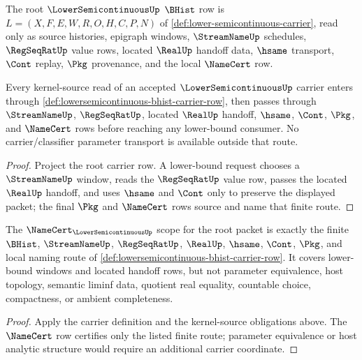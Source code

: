 \begin{definition}
\label{def:lowersemicontinuous-bhist-carrier-row}
The root $\LowerSemicontinuousUp$ $\BHist$ row is
$L=(X,F,E,W,R,O,H,C,P,N)$ of \autoref{def:lower-semicontinuous-carrier},
read only as source histories, epigraph windows, $\StreamNameUp$ schedules,
$\RegSeqRatUp$ value rows, located $\RealUp$ handoff data, $\hsame$ transport,
$\Cont$ replay, $\Pkg$ provenance, and the local $\NameCert$ row.
\end{definition}

\begin{theorem}
\label{thm:lowersemicontinuous-kernel-source-obligations}
Every kernel-source read of an accepted $\LowerSemicontinuousUp$ carrier enters
through \autoref{def:lowersemicontinuous-bhist-carrier-row}, then passes
through $\StreamNameUp$, $\RegSeqRatUp$, located $\RealUp$ handoff, $\hsame$,
$\Cont$, $\Pkg$, and $\NameCert$ rows before reaching any lower-bound consumer.
No carrier/classifier parameter transport is available outside that route.
\end{theorem}
\begin{proof}
Project the root carrier row. A lower-bound request chooses a $\StreamNameUp$
window, reads the $\RegSeqRatUp$ value row, passes the located $\RealUp$
handoff, and uses $\hsame$ and $\Cont$ only to preserve the displayed packet;
the final $\Pkg$ and $\NameCert$ rows source and name that finite route.
\end{proof}

\begin{theorem}
\label{thm:lowersemicontinuous-namecert-scope}
The $\NameCert_{\LowerSemicontinuousUp}$ scope for the root packet is exactly
the finite $\BHist$, $\StreamNameUp$, $\RegSeqRatUp$, $\RealUp$, $\hsame$,
$\Cont$, $\Pkg$, and local naming route of
\autoref{def:lowersemicontinuous-bhist-carrier-row}. It covers lower-bound
windows and located handoff rows, but not parameter equivalence, host topology,
semantic liminf data, quotient real equality, countable choice, compactness,
or ambient completeness.
\end{theorem}
\begin{proof}
Apply the carrier definition and the kernel-source obligations above. The
$\NameCert$ row certifies only the listed finite route; parameter equivalence
or host analytic structure would require an additional carrier coordinate.
\end{proof}


